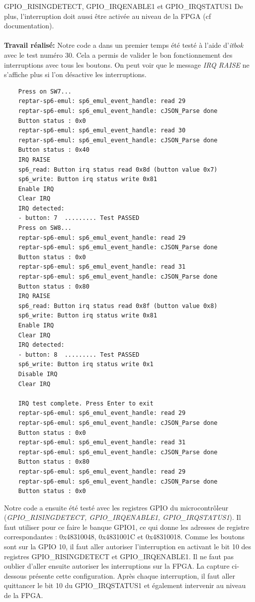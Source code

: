 GPIO\_RISINGDETECT, GPIO\_IRQENABLE1 et GPIO\_IRQSTATUS1
De plus, l'interruption doit aussi être activée au niveau de la FPGA (cf documentation). \\\\
\textbf{Travail réalisé: }Notre code a dans un premier temps été testé à l'aide d'\textit{itbok} avec le test numéro 30. Cela a permis de valider le bon fonctionnement des interruptions avec tous les boutons. On peut voir que le message \textit{IRQ RAISE} ne s'affiche plus si l'on désactive les interruptions.
\begin{lstlisting}
	Press on SW7...
	reptar-sp6-emul: sp6_emul_event_handle: read 29 
	reptar-sp6-emul: sp6_emul_event_handle: cJSON_Parse done 
	Button status : 0x0
	reptar-sp6-emul: sp6_emul_event_handle: read 30 
	reptar-sp6-emul: sp6_emul_event_handle: cJSON_Parse done 
	Button status : 0x40
	IRQ RAISE
	sp6_read: Button irq status read 0x8d (button value 0x7)
	sp6_write: Button irq status write 0x81
	Enable IRQ
	Clear IRQ
	IRQ detected:
	- button: 7  ......... Test PASSED
	Press on SW8...
	reptar-sp6-emul: sp6_emul_event_handle: read 29 
	reptar-sp6-emul: sp6_emul_event_handle: cJSON_Parse done 
	Button status : 0x0
	reptar-sp6-emul: sp6_emul_event_handle: read 31 
	reptar-sp6-emul: sp6_emul_event_handle: cJSON_Parse done 
	Button status : 0x80
	IRQ RAISE
	sp6_read: Button irq status read 0x8f (button value 0x8)
	sp6_write: Button irq status write 0x81
	Enable IRQ
	Clear IRQ
	IRQ detected:
	- button: 8  ......... Test PASSED
	sp6_write: Button irq status write 0x1
	Disable IRQ
	Clear IRQ
	
	IRQ test complete. Press Enter to exit
	reptar-sp6-emul: sp6_emul_event_handle: read 29 
	reptar-sp6-emul: sp6_emul_event_handle: cJSON_Parse done 
	Button status : 0x0
	reptar-sp6-emul: sp6_emul_event_handle: read 31 
	reptar-sp6-emul: sp6_emul_event_handle: cJSON_Parse done 
	Button status : 0x80
	reptar-sp6-emul: sp6_emul_event_handle: read 29 
	reptar-sp6-emul: sp6_emul_event_handle: cJSON_Parse done 
	Button status : 0x0
\end{lstlisting}
Notre code a ensuite été testé avec les registres GPIO du microcontrôleur (\textit{GPIO\_RISINGDETECT, GPIO\_IRQENABLE1, GPIO\_IRQSTATUS1}). Il faut utiliser pour ce faire le banque GPIO1, ce qui donne les adresses de registre correspondantes : 0x48310048, 0x4831001C et 0x48310018. Comme les boutons sont sur la GPIO 10, il faut aller autoriser l'interruption en activant le bit 10 des registres GPIO\_RISINGDETECT et  GPIO\_IRQENABLE1. Il ne faut pas oublier d'aller ensuite autoriser les interruptions sur la FPGA. La capture ci-dessous présente cette configuration. Après chaque interruption, il faut aller quittancer le bit 10 du GPIO\_IRQSTATUS1 et également intervenir au niveau de la FPGA.
